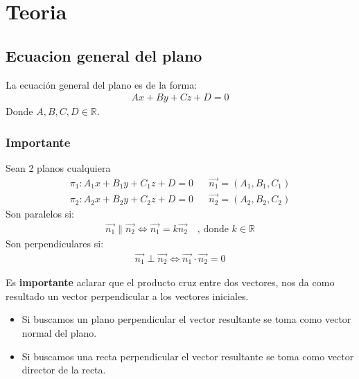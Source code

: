 \documentclass{templateNote}
\begin{document}
\portada
\margenes %


\section{Teoria}
\subsection{Ecuacion general del plano}
\indent
La ecuación general del plano es de la forma:
\begin{align*}
    Ax + By + Cz + D = 0
\end{align*}
Donde $A, B, C, D \in \mathbb{R}$.

\subsubsection{Importante}
Sean 2 planos cualquiera
\begin{align*}
    \pi_1: A_1x + B_1y + C_1z + D = 0 && \overrightarrow{n_1} = (A_1, B_1, C_1)\\
    \pi_2: A_2x + B_2y + C_2z + D = 0 && \overrightarrow{n_2} = (A_2, B_2, C_2)
\end{align*}
Son paralelos si:
\begin{align*}
    \overrightarrow{n_1} \parallel \overrightarrow{n_2} \iff \overrightarrow{n_1} = k\overrightarrow{n_2} \quad \text{, donde } k \in \mathbb{R}
\end{align*}
Son perpendiculares si:
\begin{align*}
    \overrightarrow{n_1} \perp \overrightarrow{n_2} \iff \overrightarrow{n_1} \cdot \overrightarrow{n_2} = 0
\end{align*}

Es \textbf{importante} aclarar que el producto cruz entre dos vectores, nos da como resultado un vector perpendicular a los vectores iniciales.
\begin{itemize}
    \item Si buscamos un plano perpendicular el vector resultante se toma como vector normal del plano.
    \item Si buscamos una recta perpendicular el vector resultante se toma como vector director de la recta.
\end{itemize}
\end{document}
